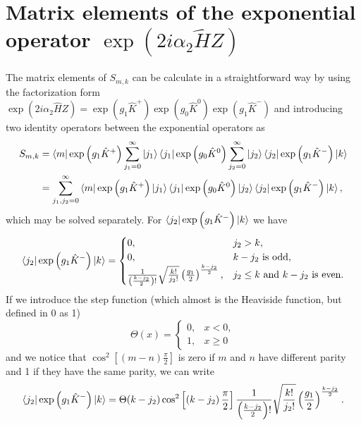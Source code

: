 \documentclass[12pt]{article}
\numberwithin{equation}{section}
\begin{document}
\section{Matrix elements of the exponential operator $\exp\left( 2 i \alpha_{2}\hat{H} Z \right)$}
The matrix elements of $S_{m,k}$ can be calculate in a straightforward way by using the factorization form $\exp\left( 2 i \alpha_{2}\hat{H} Z \right)=\exp\left( g_1 \hat{K}^+ \right) \exp\left(g_0 \hat{K}^0 \right) \exp\left(g_1 \hat{K}^- \right) $ and introducing two identity operators between the exponential operators as
\begin{align}\label{B1}
S_{m,k}&=\bra{m} \exp\left( g_1 \hat{K}^+ \right) \sum_{j_1=0}^{\infty}\ket{j_1}\bra{j_1} \exp\left(g_0 \hat{K}^0 \right) \sum_{j_2=0}^{\infty}\ket{j_2}\bra{j_2} \exp\left(g_1 \hat{K}^- \right)  \ket{k}
\nonumber \\
&=\sum_{j_1,j_2=0}^{\infty} \bra{m} \exp\left( g_1 \hat{K}^+ \right) \ket{j_1}\bra{j_1} \exp\left(g_0 \hat{K}^0 \right) \ket{j_2}\bra{j_2} \exp\left(g_1 \hat{K}^- \right)  \ket{k},
\end{align}
which may be solved separately. For $\bra{j_2} \exp\left(g_1 \hat{K}^- \right)\ket{k}$ we have
\begin{align} \label{B2}
\bra{j_2} \exp\left(g_1 \hat{K}^- \right)  \ket{k}=
\begin{cases}
0, & j_2>k,\\
0, &  k-j_2 \text{ is odd,}\\
\frac{1}{\left(\frac{k-j_2}{2} \right)! } \sqrt{\frac{k!}{j_2!}}\left(\frac{g_1}{2} \right)^{\frac{k-j_2}{2}} ,  &  j_2\leq k \text{ and }  k-j_2 \text{ is even.}
\end{cases}
\end{align}
If we introduce the step function (which almost is the Heaviside function, but defined in 0 as 1)
\begin{equation} \label{B3}
\Theta(x)=
\begin{cases}
0, & x<0,\\
1, & x \geq 0
\end{cases}
\end{equation}
and we notice that  $\cos^2\left[\left(m-n \right)\frac{\pi}{2}  \right] $ is zero if $m$ and $n$ have different parity and 1 if they have the same parity, we can write
\begin{align} \label{B4}
\bra{j_2} \exp\left(g_1 \hat{K}^- \right)  \ket{k}=
\Theta(k-j_2)\cos^2\left[\left(k-j_2 \right)\frac{\pi}{2}  \right]\frac{1}{\left(\frac{k-j_2}{2} \right)! } \sqrt{\frac{k!}{j_2!}}\left(\frac{g_1}{2} \right)^{\frac{k-j_2}{2}}.
\end{align}
\end{document}
